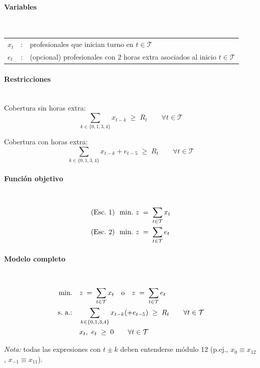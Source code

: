 \paragraph{Variables}\mbox{}\\
\begin{tabular}{l c l}
    $x_t$ & : & profesionales que inician turno en $t\in\mathcal{T}$\\
    $e_t$ & : & (opcional) profesionales con 2 horas extra asociados al inicio $t\in\mathcal{T}$\\
\end{tabular}

\paragraph{Restricciones}\mbox{}\\
Cobertura sin horas extra:
\begin{equation}
    \sum_{k\in\{0,1,3,4\}} x_{t-k} \;\geq\; R_t \qquad \forall t\in\mathcal{T}
\end{equation}

Cobertura con horas extra:
\begin{equation}
    \sum_{k\in\{0,1,3,4\}} x_{t-k} + e_{t-5} \;\geq\; R_t \qquad \forall t\in\mathcal{T}
\end{equation}

\paragraph{Función objetivo}\mbox{}\\
\begin{align}
& \mbox{(Esc.~1) }\ \mbox{min.}\ z \;=\; \sum_{t\in\mathcal{T}} x_t \notag \\
& \mbox{(Esc.~2) }\ \mbox{min.}\ z \;=\; \sum_{t\in\mathcal{T}} e_t \notag
\end{align}

\paragraph{Modelo completo}\mbox{}\\
\begin{align}
\mbox{min.}\quad & z \;=\; \sum_{t\in\mathcal{T}} x_t \quad \text{o} \quad z \;=\; \sum_{t\in\mathcal{T}} e_t \notag \\
\mbox{s.\ a.:}\quad 
& \sum_{k\in\{0,1,3,4\}} x_{t-k} (+ e_{t-5}) \;\geq\; R_t \qquad \forall t\in\mathcal{T} \notag \\
& x_t,\ e_t \;\geq\; 0 \qquad \forall t\in\mathcal{T} \notag
\end{align}

\medskip
\textit{Nota:} todas las expresiones con $t\pm k$ deben entenderse módulo 12 (p.ej., $x_{0}\equiv x_{12}$, $x_{-1}\equiv x_{11}$).
